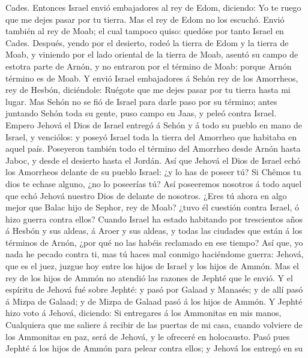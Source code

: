 Cades.  Entonces Israel envió embajadores al rey de Edom,
diciendo: Yo te ruego que me dejes pasar por tu tierra. Mas el rey de
Edom no los escuchó. Envió también al rey de Moab; el cual tampoco
quiso: quedóse por tanto Israel en Cades.  Después, yendo
por el desierto, rodeó la tierra de Edom y la tierra de Moab, y viniendo
por el lado oriental de la tierra de Moab, asentó su campo de estotra
parte de Arnón, y no entraron por el término de Moab: porque Arnón
término es de Moab.  Y envió Israel embajadores á Sehón
rey de los Amorrheos, rey de Hesbón, diciéndole: Ruégote que me dejes
pasar por tu tierra hasta mi lugar.  Mas Sehón no se fió
de Israel para darle paso por su término; antes juntando Sehón toda su
gente, puso campo en Jaas, y peleó contra Israel.  Empero
Jehová el Dios de Israel entregó á Sehón y á todo su pueblo en mano de
Israel, y venciólos: y poseyó Israel toda la tierra del Amorrheo que
habitaba en aquel país.  Poseyeron también todo el
término del Amorrheo desde Arnón hasta Jaboc, y desde el desierto hasta
el Jordán.  Así que Jehová el Dios de Israel echó los
Amorrheos delante de su pueblo Israel: ¿y lo has de poseer tú?
 Si Chêmos tu dios te echase alguno, ¿no lo poseerías tú?
Así poseeremos nosotros á todo aquel que echó Jehová nuestro Dios de
delante de nosotros.  ¿Eres tú ahora en algo mejor que
Balac hijo de Sephor, rey de Moab? ¿tuvo él cuestión contra Israel, ó
hizo guerra contra ellos?  Cuando Israel ha estado
habitando por trescientos años á Hesbón y sus aldeas, á Aroer y sus
aldeas, y todas las ciudades que están á los términos de Arnón, ¿por qué
no las habéis reclamado en ese tiempo?  Así que, yo nada
he pecado contra ti, mas tú haces mal conmigo haciéndome guerra: Jehová,
que es el juez, juzgue hoy entre los hijos de Israel y los hijos de
Ammón.  Mas el rey de los hijos de Ammón no atendió las
razones de Jephté que le envió.  Y el espíritu de Jehová
fué sobre Jephté: y pasó por Galaad y Manasés; y de allí pasó á Mizpa de
Galaad; y de Mizpa de Galaad pasó á los hijos de Ammón. 
Y Jephté hizo voto á Jehová, diciendo: Si entregares á los Ammonitas en
mis manos,  Cualquiera que me saliere á recibir de las
puertas de mi casa, cuando volviere de los Ammonitas en paz, será de
Jehová, y le ofreceré en holocausto.  Pasó pues Jephté á
los hijos de Ammón para pelear contra ellos; y Jehová los entregó en su
